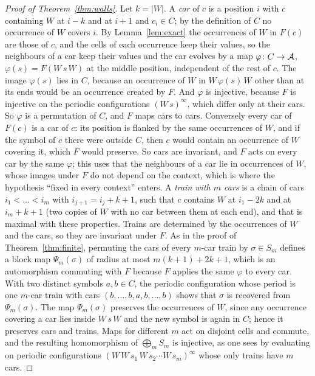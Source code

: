 \begin{proof}[Proof of Theorem~\ref{thm:walls}]
Let $k=|W|$. A \emph{car} of $c$ is a position $i$ with $c$ containing $W$ at $i-k$ and at $i+1$ and $c_i\in C$; by the definition of $C$ no occurrence of $W$ covers $i$. By Lemma~\ref{lem:exact} the occurrences of $W$ in $F(c)$ are those of $c$, and the cells of each occurrence keep their values, so the neighbours of a car keep their values and the car evolves by a map $\varphi\colon C\to\mathcal{A}$, $\varphi(s)=F(W\,s\,W)$ at the middle position, independent of the rest of $c$. The image $\varphi(s)$ lies in $C$, because an occurrence of $W$ in $W\,\varphi(s)\,W$ other than at its ends would be an occurrence created by $F$. And $\varphi$ is injective, because $F$ is injective on the periodic configurations $(W\,s)^{\infty}$, which differ only at their cars. So $\varphi$ is a permutation of $C$, and $F$ maps cars to cars. Conversely every car of $F(c)$ is a car of $c$: its position is flanked by the same occurrences of $W$, and if the symbol of $c$ there were outside $C$, then $c$ would contain an occurrence of $W$ covering it, which $F$ would preserve. So cars are invariant, and $F$ acts on every car by the same $\varphi$; this uses that the neighbours of a car lie in occurrences of $W$, whose images under $F$ do not depend on the context, which is where the hypothesis ``fixed in every context'' enters. A \emph{train with $m$ cars} is a chain of cars $i_1<\dots<i_m$ with $i_{j+1}=i_j+k+1$, such that $c$ contains $W$ at $i_1-2k$ and at $i_m+k+1$ (two copies of $W$ with no car between them at each end), and that is maximal with these properties. Trains are determined by the occurrences of $W$ and the cars, so they are invariant under $F$. As in the proof of Theorem~\ref{thm:finite}, permuting the cars of every $m$-car train by $\sigma\in S_m$ defines a block map $\Psi_m(\sigma)$ of radius at most $m(k+1)+2k+1$, which is an automorphism commuting with $F$ because $F$ applies the same $\varphi$ to every car. With two distinct symbols $a,b\in C$, the periodic configuration whose period is one $m$-car train with cars $(b,\dots,b,a,b,\dots,b)$ shows that $\sigma$ is recovered from $\Psi_m(\sigma)$. The map $\Psi_m(\sigma)$ preserves the occurrences of $W$, since any occurrence covering a car lies inside $W\,s\,W$ and the new symbol is again in $C$; hence it preserves cars and trains. Maps for different $m$ act on disjoint cells and commute, and the resulting homomorphism of $\bigoplus_mS_m$ is injective, as one sees by evaluating on periodic configurations $(W\,W\,s_1\,W\,s_2\cdots W\,s_m)^{\infty}$ whose only trains have $m$ cars.
\end{proof}

